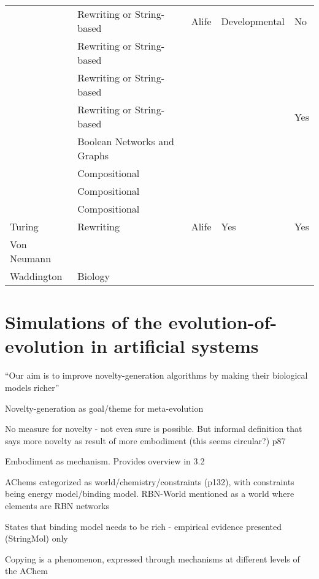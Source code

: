 \begin{table}
\begin{tabular}{@{}lllll@{}}
		\cite{Antonakopoulos:2011th}									&Rewriting or String-based	&Alife	&Developmental 	&No\\
		\cite{Dittrich1998}												&Rewriting or String-based&&&\\
		\cite{Fenizio2000}\cite{Fenizio2001}							&Rewriting or String-based&&&\\
		\cite{Fontana1992}												&Rewriting or String-based&&&Yes\\
		\cite{Nellis2012}\cite{Nellis2014}								&Boolean Networks and Graphs&&&\\
		\cite{Segre1998}												&Compositional&&&\\
		\cite{Vasas2015, Vasas2012, Vasas2012a}							&Compositional&&&\\
		\cite{Kauffman1986}												&Compositional&&&\\
		Turing															&Rewriting 	&Alife	&Yes	&Yes\\
		Von Neumann														&&&&\\
		Waddington														&	Biology&&&\\
		\hline
	\end{tabular}
\end{table}

\section{Simulations of the evolution-of-evolution in artificial systems}

\parencite{Nellis2012}

``Our aim is to improve novelty-generation algorithms by making their biological models richer''

Novelty-generation as goal/theme for meta-evolution

No measure for novelty - not even sure is possible. But informal definition that says more novelty as result of more embodiment (this seems circular?) p87

Embodiment as mechanism. Provides overview in 3.2

AChems categorized as world/chemistry/constraints (p132), with constraints being energy model/binding model. RBN-World mentioned as a world where elements are RBN networks

States that binding model needs to be rich - empirical evidence presented (StringMol) only

Copying is a phenomenon, expressed through mechanisms at different levels of the AChem

